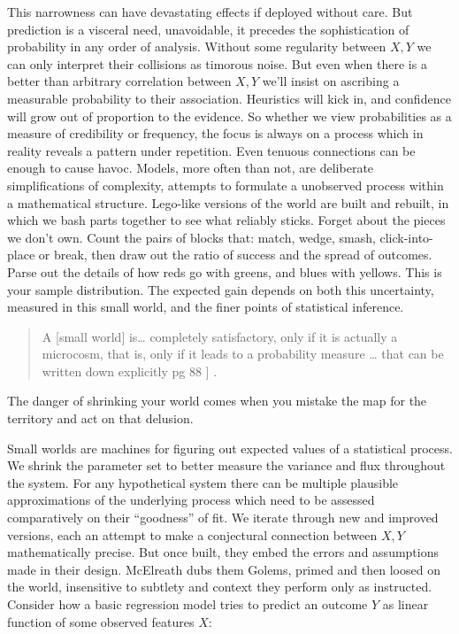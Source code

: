 \documentclass[]{tufte-book}
\theoremstyle{definition}
\theoremstyle{definition}
\theoremstyle{definition}
\theoremstyle{remark}
\begin{document}
This narrowness can have devastating effects if deployed without care. But prediction is a visceral need, unavoidable, it precedes the sophistication of probability in any order of analysis. Without some regularity between \(X, Y\) we can only interpret their collisions as timorous noise. But even when there is a better than arbitrary correlation between \(X, Y\) we'll insist on ascribing a measurable probability to their association. Heuristics will kick in, and confidence will grow out of proportion to the evidence. So whether we view probabilities as a measure of credibility or frequency, the focus is always on a process which in reality reveals a pattern under repetition. Even tenuous connections can be enough to cause havoc. Models, more often than not, are deliberate simplifications of complexity, attempts to formulate a unobserved process within a mathematical structure. Lego-like versions of the world are built and rebuilt, in which we bash parts together to see what reliably sticks. Forget about the pieces we don't own. Count the pairs of blocks that: match, wedge, smash, click-into-place or break, then draw out the ratio of success and the spread of outcomes. Parse out the details of how reds go with greens, and blues with yellows. This is your sample distribution. The expected gain depends on both this uncertainty, measured in this small world, and the finer points of statistical inference.

\begin{quote}
A {[}small world{]} is\ldots{} completely satisfactory, only if it is actually a microcosm, that is, only if it leads to a probability measure \ldots{} that can be written down explicitly pg 88 \citep{savage54}{]} .
\end{quote}

The danger of shrinking your world comes when you mistake the map for the territory and act on that delusion.

Small worlds are machines for figuring out expected values of a statistical process. We shrink the parameter set to better measure the variance and flux throughout the system. For any hypothetical system there can be multiple plausible approximations of the underlying process which need to be assessed comparatively on their ``goodness'' of fit. We iterate through new and improved versions, each an attempt to make a conjectural connection between \(X, Y\) mathematically precise. But once built, they embed the errors and assumptions made in their design. McElreath dubs them Golems, primed and then loosed on the world, insensitive to subtlety and context they perform only as instructed. Consider how a basic regression model tries to predict an outcome \(Y\) as linear function of some observed features \(X\):
\end{document}
